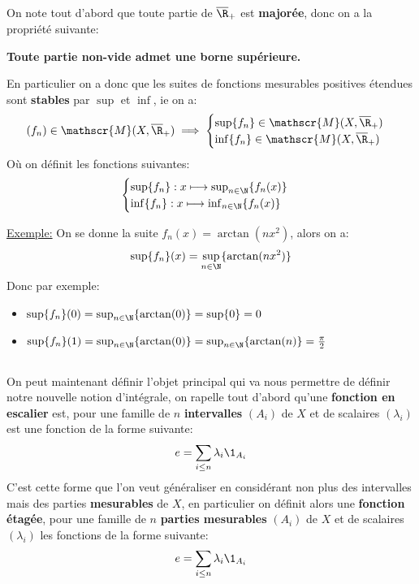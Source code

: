 \subsection*{}
On note tout d'abord que toute partie de \(\overline{\R}_+\) est \textbf{majorée}, donc on a la propriété suivante:
\begin{center}
   \textbf{Toute partie non-vide admet une borne supérieure.}
\end{center}
En particulier on a donc que les suites de fonctions mesurables positives étendues sont \textbf{stables} par \(\sup\) et \(\inf\), ie on a:
\[
   (f_n) \in \mathscr{M}(X, \overline{\R}_+) \implies \begin{cases}\textstyle{\sup}\{f_n\} \in \mathscr{M}(X, \overline{\R}_+) \\ \textstyle{\inf}\{f_n\} \in \mathscr{M}(X, \overline{\R}_+)\end{cases} 
\]
Où on définit les fonctions suivantes:
\[
   \begin{cases}
      \sup\{f_n\}: x \longmapsto \sup_{n \in \N}\{f_n(x)\}\\
      \inf\{f_n\}: x \longmapsto \inf_{n \in \N}\{f_n(x)\}     
   \end{cases}
\]
\pagebreak

\uline{Exemple:} On se donne la suite \(f_n(x) = \arctan(nx^2)\), alors on a:
\[
   \sup\{f_n\}(x) = \sup_{n \in \N}\{\arctan(nx^2)\}
\]
Donc par exemple:
\begin{itemize}
   \item \(\sup\{f_n\}(0) = \sup_{n \in \N}\{\arctan(0)\} = \sup\{0\} = 0\)
   \item \(\sup\{f_n\}(1) = \sup_{n \in \N}\{\arctan(0)\} = \sup_{n \in \N}\{\arctan(n)\} = \frac{\pi}{2}\)
\end{itemize}

\subsection*{}
On peut maintenant définir l'objet principal qui va nous permettre de définir notre nouvelle notion d'intégrale, on rapelle tout d'abord qu'une \textbf{fonction en escalier} est, pour une famille de \(n\) \textbf{intervalles} \((A_i)\) de \(X\) et de scalaires \((\lambda_i)\) est une fonction de la forme suivante:
\[
   e = \sum_{i \leq n} \lambda_i\1_{A_i}
\]
C'est cette forme que l'on veut généraliser en considérant non plus des intervalles mais des parties \textbf{mesurables} de \(X\), en particulier on définit alors une \textbf{fonction étagée}, pour une famille de \(n\) \textbf{parties mesurables} \((A_i)\) de \(X\) et de scalaires \((\lambda_i)\) les fonctions de la forme suivante:
\[
   e = \sum_{i \leq n} \lambda_i\1_{A_i}
\]

